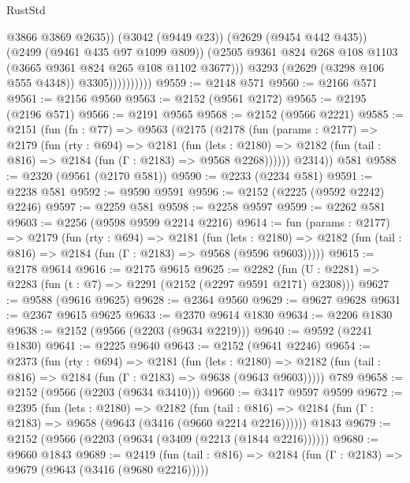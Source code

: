 \begin{lexlean}{RustStd}
\begin{coremodule}
                              @3866
                              @3869
                              @2635))
                          (@3042 (@9449 @23))
                          (@2629 (@9454 @442 @435))
                          (@2499 (@9461 @435 @97 @1099 @809))
                          (@2505
                            @9361
                            @824
                            @268
                            @108
                            @1103
                            (@3665 @9361 @824 @265 @108 @1102 @3677)))
                        @3293
                        (@2629 (@3298 @106 @555 @4348))
                        @3305))))))))))
@9559 := @2148 @571
@9560 := @2166 @571
@9561 := @2156 @9560
@9563 := @2152 (@9561 @2172)
@9565 := @2195 (@2196 @571)
@9566 := @2191 @9565
@9568 := @2152 (@9566 @2221)
@9585 := @2151
    (fun (fn : @77) =>
    @9563
      (@2175
        (@2178
          (fun (params : @2177) =>
          @2179
            (fun (rty : @694) =>
            @2181
              (fun (lets : @2180) =>
              @2182 (fun (tail : @816) => @2184 (fun (Γ : @2183) => @9568 @2268))))))
        @2314))
    @581
@9588 := @2320 (@9561 (@2170 @581))
@9590 := @2233 (@2234 @581)
@9591 := @2238 @581
@9592 := @9590 @9591
@9596 := @2152 (@2225 (@9592 @2242) @2246)
@9597 := @2259 @581
@9598 := @2258 @9597
@9599 := @2262 @581
@9603 := @2256 (@9598 @9599 @2214 @2216)
@9614 := fun (params : @2177) =>
  @2179
    (fun (rty : @694) =>
    @2181
      (fun (lets : @2180) =>
      @2182 (fun (tail : @816) => @2184 (fun (Γ : @2183) => @9568 (@9596 @9603)))))
@9615 := @2178 @9614
@9616 := @2175 @9615
@9625 := @2282 (fun (U : @2281) => @2283 (fun (t : @7) => @2291 (@2152 (@2297 @9591 @2171) @2308)))
@9627 := @9588 (@9616 @9625)
@9628 := @2364 @9560
@9629 := @9627 @9628
@9631 := @2367 @9615 @9625
@9633 := @2370 @9614 @1830
@9634 := @2206 @1830
@9638 := @2152 (@9566 (@2203 (@9634 @2219)))
@9640 := @9592 (@2241 @1830)
@9641 := @2225 @9640
@9643 := @2152 (@9641 @2246)
@9654 := @2373
    (fun (rty : @694) =>
    @2181
      (fun (lets : @2180) =>
      @2182 (fun (tail : @816) => @2184 (fun (Γ : @2183) => @9638 (@9643 @9603)))))
    @789
@9658 := @2152 (@9566 (@2203 (@9634 @3410)))
@9660 := @3417 @9597 @9599
@9672 := @2395
    (fun (lets : @2180) =>
    @2182
      (fun (tail : @816) => @2184 (fun (Γ : @2183) => @9658 (@9643 (@3416 (@9660 @2214 @2216))))))
    @1843
@9679 := @2152 (@9566 (@2203 (@9634 (@3409 (@2213 (@1844 @2216))))))
@9680 := @9660 @1843
@9689 := @2419
    (fun (tail : @816) => @2184 (fun (Γ : @2183) => @9679 (@9643 (@3416 (@9680 @2216)))))

\end{coremodule}
\end{lexlean}
